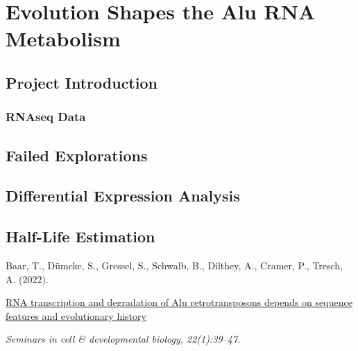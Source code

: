 
\chapter{Evolution Shapes the Alu RNA Metabolism}

\section{Project Introduction}

\subsection{RNAseq Data}

\section{Failed Explorations}

\section{Differential Expression Analysis}

\section{Half-Life Estimation}

\begin{tcolorbox}[
  boxrule=0pt, leftrule=1pt, colframe=s-blue, colback=white, sharp corners=all]%
  \raggedright
  Baar, T., Dümcke, S., Gressel, S., Schwalb, B.,
  Dilthey, A., Cramer, P., Tresch, A. (2022).
  
  \smallskip
  \href{http://www.overleaf.com}
    {RNA transcription and degradation of Alu retrotransposons depends on
    sequence features and evolutionary history}

  \smallskip
  \textit{Seminars in cell \& developmental biology, 22(1):39–47.}
\end{tcolorbox}


